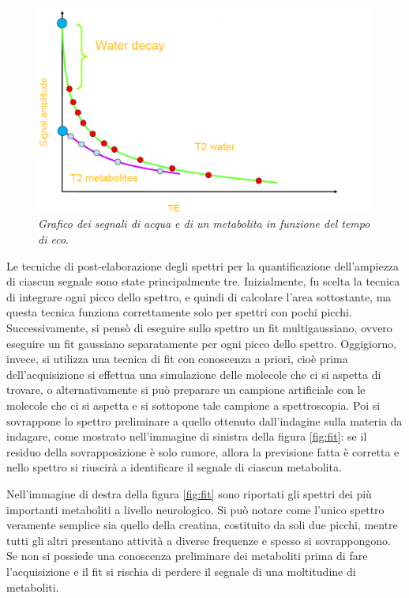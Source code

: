 \documentclass{report}
\newcommand{\figref}[1]{figura \ref{#1}}
\numberwithin{equation}{section}
\numberwithin{figure}{section}
\begin{document}
\begin{figure}[htp]
\centering
\includegraphics[scale=0.5]{immagini/meta.png}
\caption{\label{fig:meta} \textit{Grafico dei segnali di acqua e di un metabolita in funzione del tempo di eco}.}
\end{figure}

Le tecniche di post-elaborazione degli spettri per la quantificazione dell'ampiezza di ciascun segnale sono state principalmente tre. Inizialmente, fu scelta la tecnica di integrare ogni picco dello spettro, e quindi di calcolare l'area sottostante, ma questa tecnica funziona correttamente solo per spettri con pochi picchi. Successivamente, si pensò di eseguire sullo spettro un fit multigaussiano, ovvero eseguire un fit gaussiano separatamente per ogni picco dello spettro. Oggigiorno, invece, si utilizza una tecnica di fit con conoscenza a priori, cioè prima dell'acquisizione si effettua una simulazione delle molecole che ci si aspetta di trovare, o alternativamente si può preparare un campione artificiale con le molecole che ci si aspetta e si sottopone tale campione a spettroscopia. Poi si sovrappone lo spettro preliminare a quello ottenuto dall'indagine sulla materia da indagare, come mostrato nell'immagine di sinistra della \figref{fig:fit}: se il residuo della sovrapposizione è solo rumore, allora la previsione fatta è corretta e nello spettro si riuscirà a identificare il segnale di ciascun metabolita.

Nell'immagine di destra della \figref{fig:fit} sono riportati gli spettri dei più importanti metaboliti a livello neurologico. Si può notare come l'unico spettro veramente semplice sia quello della creatina, costituito da soli due picchi, mentre tutti gli altri presentano attività a diverse frequenze e spesso si sovrappongono. Se non si possiede una conoscenza preliminare dei metaboliti prima di fare l'acquisizione e il fit si rischia di perdere il segnale di una moltitudine di metaboliti.
\end{document}
